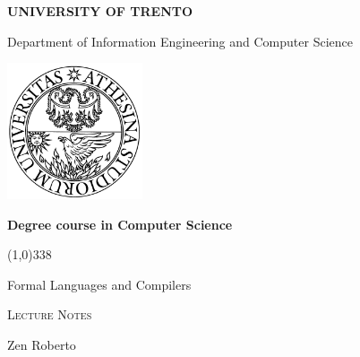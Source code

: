\begin{titlepage}
	\pagestyle{empty}

	\begin{center}
		{\bfseries\Large {\huge U}NIVERSITY OF {\huge T}RENTO}

		\vspace{0.2cm}

		{\Large Department of Information Engineering and Computer Science}

		\vspace{0.5cm}

		\begin{center}
			\includegraphics[width=0.3\textwidth]{img/unitn.png}
		\end{center}

		\vspace{0.5cm}

		{\bfseries \Large Degree course in Computer Science}

		\vspace{0.3cm}
		\line(1,0){338}
		\vspace{2.3cm}

		{\huge Formal Languages and Compilers}

		\vspace{0.2cm}

		{\huge \textsc{Lecture Notes}}

		\vspace{0.2cm}

		\large
		\begin{center}

			Zen Roberto

		\end{center}

		\vfill

	\end{center}

\end{titlepage}
